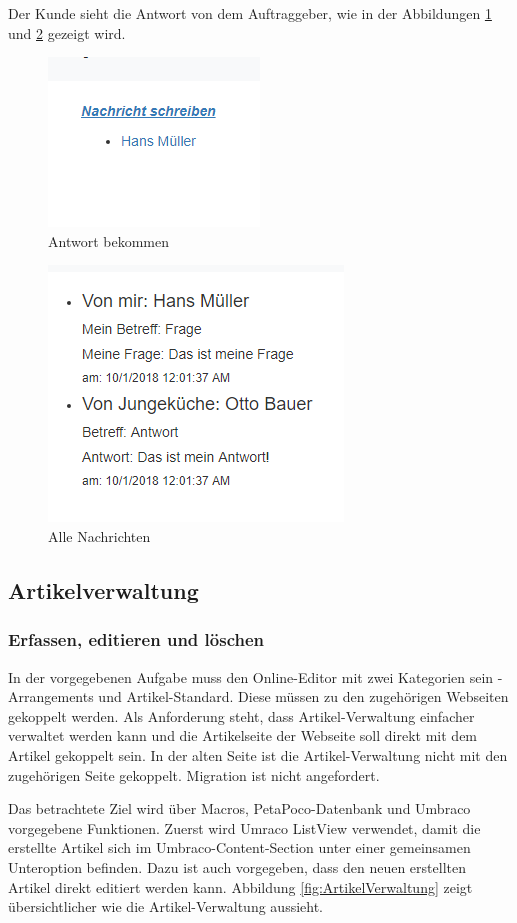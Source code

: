 Der Kunde sieht die Antwort von dem Auftraggeber, wie in der Abbildungen \ref{fig:bekommen} und \ref{fig:alleNachrichten} gezeigt wird.
\begin{figure}[h]
	\centering
	\includegraphics[width=0.3\linewidth]{Graphics/nachrichtBekomm.png}
	\caption[Nachricht]{Antwort bekommen}
	\label{fig:bekommen}
\end{figure}

\begin{figure}[h]
	\centering
	\includegraphics[width=0.3\linewidth]{Graphics/dialog.png}
	\caption[Nachricht]{Alle Nachrichten}
	\label{fig:alleNachrichten}
\end{figure}
 
 \pagebreak
 
\subsection{Artikelverwaltung}

\subsubsection{Erfassen, editieren und löschen}

In der vorgegebenen Aufgabe muss den Online-Editor mit zwei Kategorien sein - Arrangements und Artikel-Standard. Diese müssen zu den zugehörigen Webseiten gekoppelt werden. Als Anforderung steht, dass Artikel-Verwaltung einfacher verwaltet werden kann und die Artikelseite der Webseite soll direkt mit dem Artikel gekoppelt sein. In der alten Seite ist die Artikel-Verwaltung nicht mit den zugehörigen Seite gekoppelt. Migration ist nicht angefordert.

Das betrachtete Ziel wird über Macros, PetaPoco-Datenbank \cite{Robinson2018} und Umbraco vorgegebene Funktionen. Zuerst wird Umraco ListView verwendet, damit die erstellte Artikel sich im Umbraco-Content-Section unter einer gemeinsamen Unteroption befinden. Dazu ist auch vorgegeben, dass den neuen erstellten Artikel direkt editiert werden kann. Abbildung \ref{fig:ArtikelVerwaltung} zeigt übersichtlicher wie die Artikel-Verwaltung aussieht.

